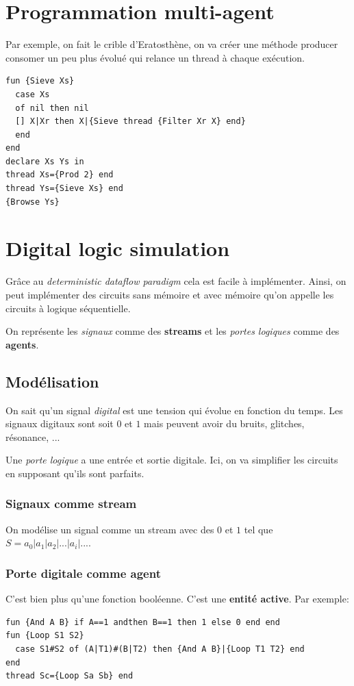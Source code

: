 \documentclass{report}
\begin{document}
\section{Programmation multi-agent}
Par exemple, on fait le crible d'Eratosthène, on va créer une méthode producer consomer un peu plus évolué qui relance un thread à chaque exécution. 
\begin{lstlisting}[escapechar=\%]
fun {Sieve Xs}
  case Xs
  of nil then nil
  [] X|Xr then X|{Sieve thread {Filter Xr X} end} 
  end
end 
declare Xs Ys in
thread Xs={Prod 2} end 
thread Ys={Sieve Xs} end
{Browse Ys}
\end{lstlisting}

\section{Digital logic simulation}
Grâce au \textit{deterministic dataflow paradigm} cela est facile à implémenter. Ainsi, on peut implémenter des circuits sans mémoire et avec mémoire qu'on appelle les circuits à logique séquentielle.\par
On représente les \textit{signaux} comme des \textbf{streams} et les \textit{portes logiques} comme des \textbf{agents}.

\subsection{Modélisation}
On sait qu'un signal \textit{digital} est une tension qui évolue en fonction du temps. Les signaux digitaux sont soit $0$ et $1$ mais peuvent avoir du bruits, glitches, résonance, ...\par
Une \textit{porte logique} a une entrée et sortie digitale. Ici, on va simplifier les circuits en supposant qu'ils sont parfaits.

\subsubsection{Signaux comme stream}
On modélise un signal comme un stream avec des $0$ et $1$ tel que $S=a_0 | a_1 | a_2 | ... | a_i | ...$.

\subsubsection{Porte digitale comme agent}
C'est bien plus qu'une fonction booléenne. C'est une \textbf{entité active}. Par exemple:
\begin{lstlisting}[escapechar=\%]
fun {And A B} if A==1 andthen B==1 then 1 else 0 end end 
fun {Loop S1 S2} 
  case S1#S2 of (A|T1)#(B|T2) then {And A B}|{Loop T1 T2} end
end
thread Sc={Loop Sa Sb} end
\end{lstlisting}
\end{document}
